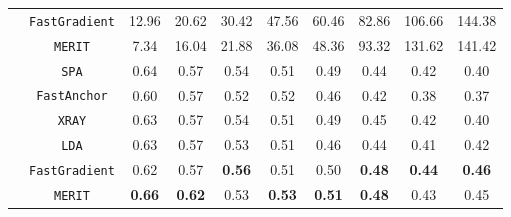 \documentclass[10pt,xcolor={usenames,dvipsnames,table}]{beamer}
\def\blue{\color{blue}}
\begin{document}
\begin{frame}
\begin{table}
{\begin{tabular}{|p{1.2cm}|c|c|c|c|c|c|c|c|c|}
        \cline{2-10}
        & \texttt{FastGradient} & 12.96  & 20.62  & 30.42  & 47.56  & 60.46  & 82.86  & 106.66 & 144.38 \\
        \cline{2-10}
        \rowcolor{green!10} & \texttt{MERIT} & 7.34 & 16.04 & 21.88 & 36.08 & 48.36 & 93.32 & 131.62 & 141.42 \\
        \cline{2-10}
        \hhline{|=|=|=|=|=|=|=|=|=|=|}
        \multirow{6}{1.6cm}{Accuracy $(\uparrow)$}
          & \texttt{SPA} & {\blue 0.64} & 0.57 & {\blue 0.54} & 0.51 & 0.49 & 0.44 & 0.42 & 0.40 \\
        \cline{2-10}
        & \texttt{FastAnchor} & 0.60 & 0.57 & 0.52 & {\blue 0.52} & 0.46 & 0.42 & 0.38 & 0.37 \\
        \cline{2-10}
        & \texttt{XRAY} & 0.63 & 0.57 & {\blue 0.54} & 0.51 & 0.49 & {\blue 0.45} & 0.42 & 0.40 \\
        \cline{2-10}
        & \texttt{LDA} & 0.63 & 0.57 & 0.53 & 0.51 & 0.46 & 0.44 & 0.41 & 0.42 \\
        \cline{2-10}
        & \texttt{FastGradient} & 0.62 & 0.57 & \textbf{0.56} & 0.51 & {\blue 0.50} & \textbf{0.48} & \textbf{0.44} & \textbf{0.46} \\
        \cline{2-10}
        \rowcolor{green!10}   & \texttt{MERIT} & \textbf{0.66} & \textbf{0.62} & 0.53 & \textbf{0.53} & \textbf{0.51} & \textbf{0.48} & {\blue 0.43} & {\blue 0.45} \\
        \cline{2-10}
        \hline 
    \end{tabular}
}
    \end{table}
\end{frame}
\end{document}
